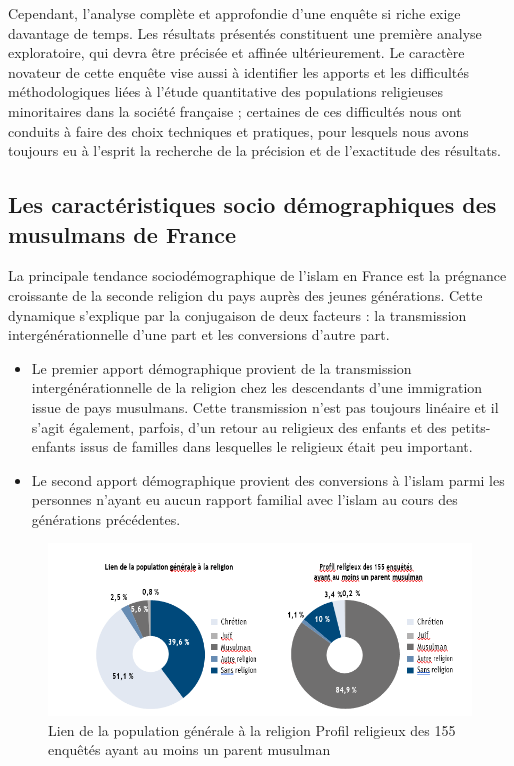 Cependant, l'analyse complète et approfondie d'une enquête si riche
exige davantage de temps. Les résultats présentés constituent une
première analyse exploratoire, qui devra être précisée et affinée
ultérieurement. Le caractère novateur de cette enquête vise aussi à
identifier les apports et les difficultés méthodologiques liées à
l'étude quantitative des populations religieuses minoritaires dans la
société française ; certaines de ces difficultés nous ont conduits à
faire des choix techniques et pratiques, pour lesquels nous avons
toujours eu à l'esprit la recherche de la précision et de l'exactitude
des résultats.



\subsection{Les caractéristiques socio démographiques des musulmans de France}

La principale tendance sociodémographique de l'islam en France est la
prégnance croissante de la seconde religion du pays auprès des jeunes
générations. Cette dynamique s'explique par la conjugaison de deux
facteurs : la transmission intergénérationnelle d'une part et les
conversions d'autre part.


\begin{itemize}
\item
  
  Le premier apport démographique provient de la transmission
  intergénérationnelle de la religion chez les descendants d'une
  immigration issue de pays musulmans. Cette transmission n'est pas
  toujours linéaire et il s'agit également, parfois, d'un retour au
  religieux des enfants et des petits-enfants issus de familles dans
  lesquelles le religieux était peu important.
  
\item
  
  Le second apport démographique provient des conversions à l'islam
  parmi les personnes n'ayant eu aucun rapport familial avec l'islam au
  cours des générations précédentes.
  
\end{itemize}

\begin{figure}
    \centering
    \includegraphics[width=\textwidth]{ImageIslamFrance/profilreligieux.png}
    \caption{Lien de la population générale à la religion Profil religieux
des 155 enquêtés ayant au moins un parent musulman}
    \label{fig:my_label}
\end{figure}

